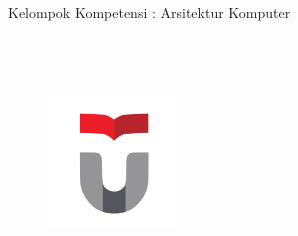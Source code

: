 \begin{titlepage}
	\begin{center}
		\vspace*{1.0cm}
		\bo{\Judul} \\[1.0cm]
		\bo{\Type} \\
		Kelompok Kompetensi : Arsitektur Komputer \\[1.0cm]
		\\[1.0cm]
		\bo{\Penulis} \\
		\bo{\npm} \\
		
		\begin{figure}
			\begin{center}
				\includegraphics[width=3.5cm]{pics/telu.png}
			\end{center}
		\end{figure}    
		
	\end{center}
\end{titlepage}